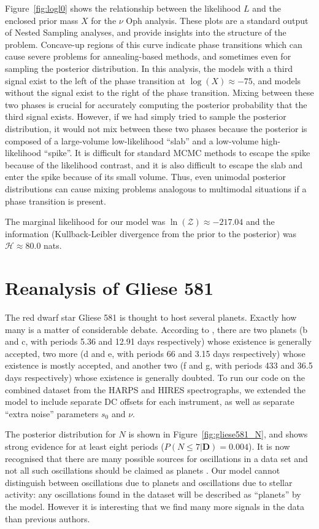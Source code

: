 \documentclass[useAMS,usenatbib]{mn2e}
\newcommand{\bdata}{\boldsymbol{D}}
\begin{document}
Figure~\ref{fig:logl0} shows the relationship between the likelihood $L$
and the enclosed prior mass $X$ for the $\nu$ Oph analysis. These plots are
a standard output of Nested Sampling \citep{skilling} analyses, and provide
insights into the structure of the problem. Concave-up regions of this curve
indicate phase transitions which can cause severe problems for annealing-based
methods, and sometimes even for sampling the posterior distribution. In this
analysis, the models with a third signal exist to the left of the phase
transition at $\log(X) \approx -75$, and models without the signal exist to the
right of the phase transition. Mixing between these two phases is crucial for
accurately computing the posterior probability that the third signal exists.
However, if we had simply tried to sample the posterior distribution, it would
not mix between these two phases because the posterior is composed of a
large-volume low-likelihood ``slab'' and a low-volume high-likelihood ``spike''.
It is difficult for standard MCMC methods to escape the spike because of the
likelihood contrast, and it is also difficult to escape the slab and enter the
spike because of its small volume. Thus, even unimodal posterior distributions
can cause mixing problems analogous to multimodal situations if a phase
transition is present.

The marginal likelihood for our model was
$\ln(\mathcal{Z}) \approx -217.04$ and the information
(Kullback-Leibler divergence from the prior to the posterior)
was $\mathcal{H} \approx 80.0$ nats.

\section{Reanalysis of Gliese 581}
The red dwarf star Gliese 581 is thought to host several planets. Exactly
how many is a matter of considerable debate. According to
\citet{2014Sci...345..440R}, there are two planets
(b and c, with periods 5.36 and 12.91 days respectively)
whose existence is generally
accepted, two more
(d and e, with periods 66 and 3.15 days respectively)
whose existence is mostly accepted, and another two
(f and g, with periods 433 and 36.5 days respectively)
whose existence is generally doubted.
To run our code on the combined dataset from the HARPS and HIRES spectrographs,
we extended the model to include separate DC offsets for each instrument, as
well as separate ``extra noise'' parameters $s_0$ and $\nu$.

The posterior distribution for $N$ is shown in Figure~\ref{fig:gliese581_N},
and shows strong evidence for at least eight periods
($P(N \leq 7 | \bdata) = 0.004$).
It is now recognised that
there are many possible sources for oscillations in a data set and not all
such oscillations should be claimed as planets \citep{2014Sci...345..440R}. 
Our model cannot distinguish between oscillations due to planets and
oscillations due to stellar activity: any oscillations found in the dataset
will be described as ``planets'' by the model. However it is interesting that
we find many more signals in the data than previous authors.
\end{document}
